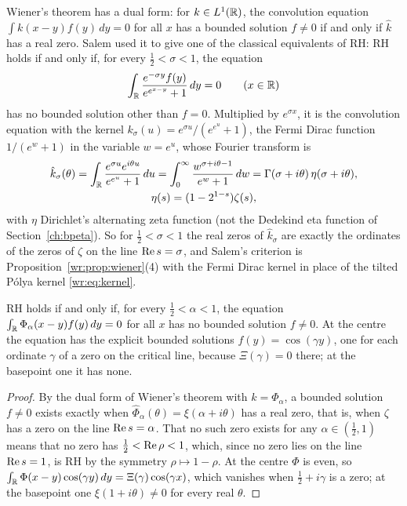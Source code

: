 Wiener's theorem has a dual form: for $k\in L^1(\mathbb{R})$, the convolution equation $\int k(x-y)f(y)\,dy=0$ for all $x$ has a bounded solution $f\ne0$ if and only if $\hat k$ has a real zero. Salem \cite{Salem53} used it to give one of the classical equivalents of RH: RH holds if and only if, for every $\frac12<\sigma<1$, the equation
\[
\int_{\mathbb{R}}\frac{e^{-\sigma y}f(y)}{e^{e^{x-y}}+1}\,dy=0\qquad(x\in\mathbb{R})
\]
has no bounded solution other than $f=0$. Multiplied by $e^{\sigma x}$, it is the convolution equation with the kernel $k_\sigma(u)=e^{\sigma u}/(e^{e^u}+1)$, the Fermi Dirac function $1/(e^w+1)$ in the variable $w=e^u$, whose Fourier transform is
\begin{gather*}
\hat k_\sigma(\theta)=\int_{\mathbb{R}}\frac{e^{\sigma u}e^{i\theta u}}{e^{e^u}+1}\,du=\int_0^\infty\frac{w^{\sigma+i\theta-1}}{e^w+1}\,dw=\Gamma(\sigma+i\theta)\,\eta(\sigma+i\theta),\\
\eta(s)=(1-2^{1-s})\zeta(s),
\end{gather*}
with $\eta$ Dirichlet's alternating zeta function (not the Dedekind eta function of Section~\ref{ch:bpeta}). So for $\frac12<\sigma<1$ the real zeros of $\hat k_\sigma$ are exactly the ordinates of the zeros of $\zeta$ on the line $\operatorname{Re} s=\sigma$, and Salem's criterion is Proposition~\ref{wr:prop:wiener}(4) with the Fermi Dirac kernel in place of the tilted P\'olya kernel \eqref{wr:eq:kernel}.

\begin{corollary}\label{wr:cor:salem}
RH holds if and only if, for every $\frac12<\alpha<1$, the equation $\int_{\mathbb{R}}\Phi_\alpha(x-y)f(y)\,dy=0$ for all $x$ has no bounded solution $f\ne0$. At the centre the equation has the explicit bounded solutions $f(y)=\cos(\gamma y)$, one for each ordinate $\gamma$ of a zero on the critical line, because $\Xi(\gamma)=0$ there; at the basepoint one it has none.
\end{corollary}

\begin{proof}
By the dual form of Wiener's theorem with $k=\Phi_\alpha$, a bounded solution $f\ne0$ exists exactly when $\hat\Phi_\alpha(\theta)=\xi(\alpha+i\theta)$ has a real zero, that is, when $\zeta$ has a zero on the line $\operatorname{Re} s=\alpha$. That no such zero exists for any $\alpha\in(\frac12,1)$ means that no zero has $\frac12<\operatorname{Re}\rho<1$, which, since no zero lies on the line $\operatorname{Re} s=1$, is RH by the symmetry $\rho\mapsto1-\rho$. At the centre $\Phi$ is even, so $\int_{\mathbb{R}}\Phi(x-y)\cos(\gamma y)\,dy=\Xi(\gamma)\cos(\gamma x)$, which vanishes when $\frac12+i\gamma$ is a zero; at the basepoint one $\xi(1+i\theta)\ne0$ for every real $\theta$.
\end{proof}

